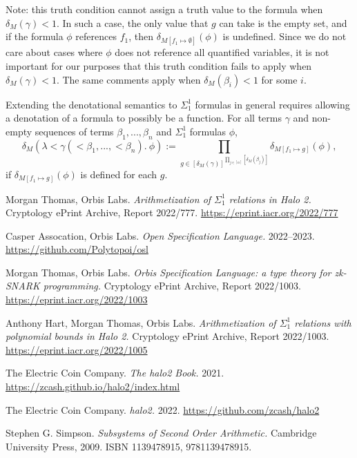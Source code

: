\documentclass[11pt]{article}
\begin{document}
\begin{enumerate}
		Note: this truth condition cannot assign a truth value to the formula when $\delta_M(\gamma) < 1$.
		In such a case, the only value that $g$ can take is the empty set, and
		if the formula $\phi$ references $f_1$, then $\delta_{M[f_1 \mapsto \emptyset]}(\phi)$
		is undefined. Since we do not care about cases where $\phi$ does not reference
		all quantified variables, it is not important for our purposes that this
		truth condition fails to apply when $\delta_M(\gamma) < 1$. The same comments
		apply when $\delta_M(\beta_i) < 1$ for some $i$.
\end{enumerate}

Extending the denotational semantics to $\Sigma^1_1$ formulas in general requires allowing a denotation of a formula to possibly be a function.
For all terms $\gamma$ and non-empty sequences of terms $\beta_1, ..., \beta_n$ and $\Sigma^1_1$ formulas $\phi$,
\begin{equation}
	\delta_M(\lambda <\gamma(<\beta_1, ..., <\beta_n).\ \phi)
	:= \prod_{g \in [\delta_M(\gamma)]^{\prod_{j \in [n]} [\delta_M(\beta_j)]}} \delta_{M[f_1 \mapsto g]}(\phi),
\end{equation}
if $\delta_{M[f_1 \mapsto g]}(\phi)$ is defined for each $g$.


\clearpage

\begin{thebibliography}{6}
	
	 Morgan Thomas, Orbis Labs. \textit{Arithmetization of $\Sigma^1_1$ relations in Halo 2.} Cryptology ePrint Archive, Report 2022/777. \url{https://eprint.iacr.org/2022/777}

	 Casper Assocation, Orbis Labs. \textit{Open Specification Language.} 2022--2023. \url{https://github.com/Polytopoi/osl}

	 Morgan Thomas, Orbis Labs. \textit{Orbis Specification Language: a type theory for zk-SNARK programming.} Cryptology ePrint Archive, Report 2022/1003. \url{https://eprint.iacr.org/2022/1003}

	 Anthony Hart, Morgan Thomas, Orbis Labs. \textit{Arithmetization of $\Sigma^1_1$ relations with polynomial bounds in Halo 2.} Cryptology ePrint Archive, Report 2022/1003. \url{https://eprint.iacr.org/2022/1005}

	 The Electric Coin Company. \textit{The halo2 Book.} 2021. \url{https://zcash.github.io/halo2/index.html}

	 The Electric Coin Company. \textit{halo2.} 2022. \url{https://github.com/zcash/halo2}

	 Stephen G. Simpson. \textit{Subsystems of Second Order Arithmetic.} Cambridge University Press, 2009. ISBN 1139478915, 9781139478915.


\end{thebibliography}
\end{document}
